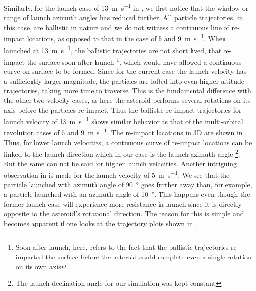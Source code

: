 Similarly, for the launch case of \SI{13}{\metre\per\second} in , we first notice that the window or range of launch azimuth angles has reduced further. All particle trajectories, in this case, are ballistic in nature and we do not witness a continuous line of re-impact locations, as opposed to that in the case of 5 and \SI{9}{\metre\per\second}. When launched at \SI{13}{\metre\per\second}, the ballistic trajectories are not short lived, that re-impact the surface soon after launch \footnote{Soon after launch, here, refers to the fact that the ballistic trajectories re-impacted the surface before the asteroid could complete even a single rotation on its own axis}, which would have allowed a continuous curve on surface to be formed. Since for the current case the launch velocity has a sufficiently larger magnitude, the particles are lofted into even higher altitude trajectories, taking more time to traverse. This is the fundamental difference with the other two velocity cases, as here the asteroid performs several rotations on its axis before the particles re-impact. Thus the ballistic re-impact trajectories for launch velocity of \SI{13}{\metre\per\second} shows similar behavior as that of the multi-orbital revolution cases of 5 and \SI{9}{\metre\per\second}. The re-impact locations in 3D are shown in .
%
\newline\newline
%
Thus, for lower launch velocities, a continuous curve of re-impact locations can be linked to the launch direction which in our case is the launch azimuth angle \footnote{The launch declination angle for our simulation was kept constant}. But the same can not be said for higher launch velocities. Another intriguing observation in  is made for the launch velocity of \SI{5}{\metre\per\second}. We see that the particle launched with azimuth angle of \SI{90}{\degree} goes further away than, for example, a particle launched with an azimuth angle of \SI{10}{\degree}. This happens even though the former launch case will experience more resistance in launch since it is directly opposite to the asteroid's rotational direction. The reason for this is simple and becomes apparent if one looks at the trajectory plots shown in .

